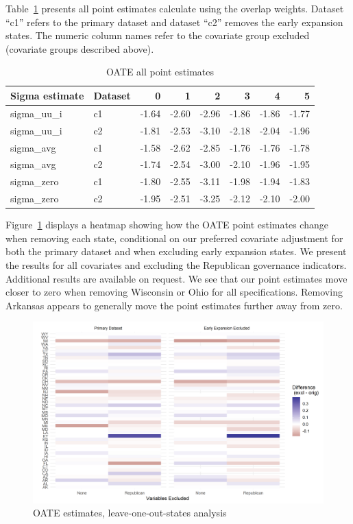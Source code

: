 Table~\ref{tab:oatesensitive} presents all point estimates calculate using the overlap weights. Dataset ``c1'' refers to the primary dataset and dataset ``c2'' removes the early expansion states. The numeric column names refer to the covariate group excluded (covariate groups described above).

\begin{table}[ht]
\centering
\caption{OATE all point estimates}
\label{tab:oatesensitive}
\begin{tabular}{llrrrrrr}
  \hline
Sigma estimate & Dataset & 0 & 1 & 2 & 3 & 4 & 5 \\ 
  \hline
sigma\_uu\_i & c1 & -1.64 & -2.60 & -2.96 & -1.86 & -1.86 & -1.77 \\ 
  sigma\_uu\_i & c2 & -1.81 & -2.53 & -3.10 & -2.18 & -2.04 & -1.96 \\ 
  sigma\_avg & c1 & -1.58 & -2.62 & -2.85 & -1.76 & -1.76 & -1.78 \\ 
  sigma\_avg & c2 & -1.74 & -2.54 & -3.00 & -2.10 & -1.96 & -1.95 \\ 
  sigma\_zero & c1 & -1.80 & -2.55 & -3.11 & -1.98 & -1.94 & -1.83 \\ 
  sigma\_zero & c2 & -1.95 & -2.51 & -3.25 & -2.12 & -2.10 & -2.00 \\ 
   \hline
\end{tabular}
\end{table}

Figure~\ref{fig:oateheatmap} displays a heatmap showing how the OATE point estimates change when removing each state, conditional on our preferred covariate adjustment for both the primary dataset and when excluding early expansion states. We present the results for all covariates and excluding the Republican governance indicators. Additional results are available on request. We see that our point estimates move closer to zero when removing Wisconsin or Ohio for all specifications. Removing Arkansas appears to generally move the point estimates further away from zero.

\begin{figure}[H]
\begin{center}
    \caption{OATE estimates, leave-one-out-states analysis}
    \label{fig:oateheatmap}
    \includegraphics[scale=0.6]{01_Plots/oate-loo-state-cov-group-heatmap-states.png}
\end{center}
\end{figure}
